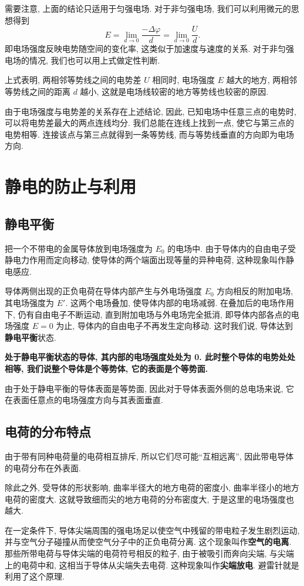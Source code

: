 \documentclass[UTF8,openany,fontset=fandol]{ctexbook}
\theoremstyle{chinesetextbook}
\begin{document}
需要注意, 上面的结论只适用于匀强电场. 对于非匀强电场, 我们可以利用微元的思想得到
\[
E=\lim_{d\rightarrow 0}\frac{-\Delta\varphi}{d}=\lim_{d\rightarrow 0}\frac{U}{d}.
\]
即电场强度反映电势随空间的变化率, 这类似于加速度与速度的关系. 对于非匀强电场的情况, 我们也可以用上式做定性判断.

上式表明, 两相邻等势线之间的电势差 $U$ 相同时, 电场强度 $E$ 越大的地方, 两相邻等势线之间的距离 $d$ 越小, 这就是电场线较密的地方等势线也较密的原因.

由于电场强度与电势差的关系存在上述结论, 因此, 已知电场中任意三点的电势时, 可以将电势差最大的两点连线均分. 我们总能在连线上找到一点, 使它与第三点的电势相等. 连接该点与第三点就得到一条等势线, 而与等势线垂直的方向即为电场方向.
\section{静电的防止与利用}
\subsection{静电平衡}
把一个不带电的金属导体放到电场强度为 $E_0$ 的电场中. 由于导体内的自由电子受静电力作用而定向移动, 使导体的两个端面出现等量的异种电荷, 这种现象叫作静电感应.

导体两侧出现的正负电荷在导体内部产生与外电场强度 $E_0$ 方向相反的附加电场, 其电场强度为 $E'$. 这两个电场叠加, 使导体内部的电场减弱. 在叠加后的电场作用下, 仍有自由电子不断运动, 直到附加电场与外电场完全抵消, 即导体内部各点的电场强度 $E=0$ 为止, 导体内的自由电子不再发生定向移动. 这时我们说, 导体达到\textbf{静电平衡}状态.

\textbf{处于静电平衡状态的导体, 其内部的电场强度处处为 0. 此时整个导体的电势处处相等, 我们说整个导体是个等势体, 它的表面是个等势面.}

由于处于静电平衡的导体表面是等势面, 因此对于导体表面外侧的总电场来说, 它在表面任意点的电场强度方向与其表面垂直.
\subsection{电荷的分布特点}
由于带有同种电荷量的电荷相互排斥, 所以它们尽可能“互相远离”, 因此带电导体的电荷分布在外表面.

除此之外, 受导体的形状影响, 曲率半径大的地方电荷的密度小, 曲率半径小的地方电荷的密度大. 这就导致细而尖的地方电荷的分布密度大, 于是这里的电场强度也越大.

在一定条件下, 导体尖端周围的强电场足以使空气中残留的带电粒子发生剧烈运动, 并与空气分子碰撞从而使空气分子中的正负电荷分离. 这个现象叫作\textbf{空气的电离}. 那些所带电荷与导体尖端的电荷符号相反的粒子, 由于被吸引而奔向尖端, 与尖端上的电荷中和, 这相当于导体从尖端失去电荷. 这种现象叫作\textbf{尖端放电}. 避雷针就是利用了这个原理.
\end{document}
